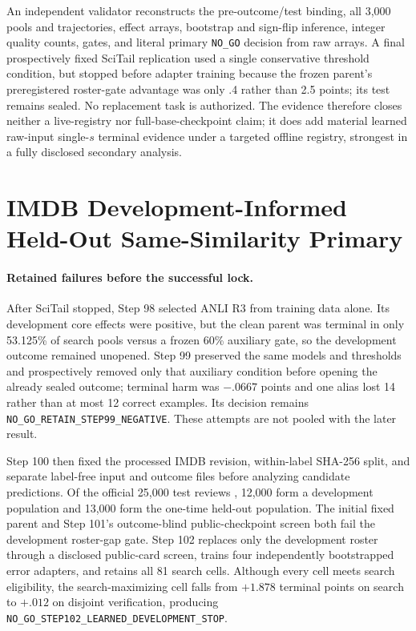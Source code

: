 

An independent validator reconstructs the pre-outcome/test binding, all 3,000 pools and trajectories, effect arrays, bootstrap and sign-flip inference, integer quality counts, gates, and literal primary \texttt{NO\_GO} decision from raw arrays. A final prospectively fixed SciTail \citep{khot2018scitail} replication used a single conservative threshold condition, but stopped before adapter training because the frozen parent's preregistered roster-gate advantage was only .4 rather than 2.5 points; its test remains sealed. No replacement task is authorized. The evidence therefore closes neither a live-registry nor full-base-checkpoint claim; it does add material learned raw-input single-$s$ terminal evidence under a targeted offline registry, strongest in a fully disclosed secondary analysis.

\section{IMDB Development-Informed Held-Out Same-Similarity Primary}
\label{app:step104}

\paragraph{Retained failures before the successful lock.}
After SciTail stopped, Step 98 selected ANLI R3 \citep{nie2020adversarial} from training data alone. Its development core effects were positive, but the clean parent was terminal in only 53.125\% of search pools versus a frozen 60\% auxiliary gate, so the development outcome remained unopened. Step 99 preserved the same models and thresholds and prospectively removed only that auxiliary condition before opening the already sealed outcome; terminal harm was $-.0667$ points and one alias lost 14 rather than at most 12 correct examples. Its decision remains \texttt{NO\_GO\_RETAIN\_STEP99\_NEGATIVE}. These attempts are not pooled with the later result.

Step 100 then fixed the processed IMDB revision, within-label SHA-256 split, and separate label-free input and outcome files before analyzing candidate predictions. Of the official 25,000 test reviews \citep{maas2011learning}, 12,000 form a development population and 13,000 form the one-time held-out population. The initial fixed parent and Step 101's outcome-blind public-checkpoint screen both fail the development roster-gap gate. Step 102 replaces only the development roster through a disclosed public-card screen, trains four independently bootstrapped error adapters, and retains all 81 search cells. Although every cell meets search eligibility, the search-maximizing cell falls from $+1.878$ terminal points on search to $+.012$ on disjoint verification, producing \texttt{NO\_GO\_STEP102\_LEARNED\_DEVELOPMENT\_STOP}.

